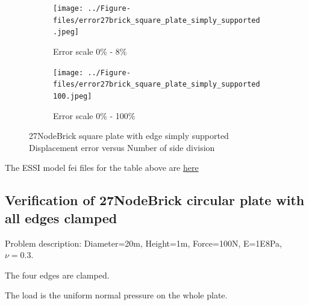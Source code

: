 \documentclass[fleqn,11pt]{article}
\begin{document}
\begin{figure}[H]
  \begin{subfigure}{0.5\textwidth}
    \centering
    \texttt{[image: ../Figure-files/error27brick\_square\_plate\_simply\_supported.jpeg]}
    \caption{Error scale 0\% - 8\%}
  \end{subfigure}
  \begin{subfigure}{0.5\textwidth}
    \centering
    \texttt{[image: ../Figure-files/error27brick\_square\_plate\_simply\_supported100.jpeg]}
    \caption{Error scale 0\% - 100\%}
  \end{subfigure}
  \captionsetup{justification=centering,margin=3cm}
  \caption{27NodeBrick square plate with edge simply supported\\
      Displacement error   versus   Number of side division}
  \label{fig 27NodeBrick square plate with four edge simply supported}
\end{figure}





The ESSI model fei files for the table above are \href{https://github.com/yuan-energy/ESSI_Verification/blob/master/27NodeBrick/square_plate_simply_support/square_plate_simply_support.tar.gz?raw=true}{here}

























\newpage
\subsection{Verification of 27NodeBrick circular plate with all edges clamped}

Problem description: Diameter=20m, Height=1m, Force=100N, E=1E8Pa, $\nu=0.3$. 

The four edges are clamped. 

The load is the uniform normal pressure on the whole plate. 
\end{document}
